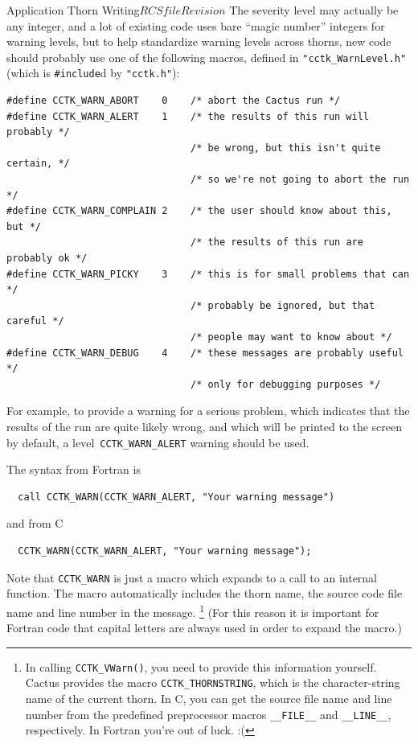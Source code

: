 \begin{cactuspart}{Application Thorn Writing}{$RCSfile$}{$Revision$}
The severity level may actually be any integer, and a lot of existing
code uses bare ``magic number'' integers for warning levels, but to
help standardize warning levels across thorns, new code should probably
use one of the following macros, defined in \verb|"cctk_WarnLevel.h"|
(which is \verb|#include|d by \verb|"cctk.h"|):
\begin{verbatim}
#define CCTK_WARN_ABORT    0    /* abort the Cactus run */
#define CCTK_WARN_ALERT    1    /* the results of this run will probably */
                                /* be wrong, but this isn't quite certain, */
                                /* so we're not going to abort the run */
#define CCTK_WARN_COMPLAIN 2    /* the user should know about this, but */
                                /* the results of this run are probably ok */
#define CCTK_WARN_PICKY    3    /* this is for small problems that can */
                                /* probably be ignored, but that careful */
                                /* people may want to know about */
#define CCTK_WARN_DEBUG    4    /* these messages are probably useful */
                                /* only for debugging purposes */
\end{verbatim}

For example, to provide a warning for a serious problem, which
indicates that the results of the run are quite likely wrong,
and which will be printed to the screen by default,
a level~\verb|CCTK_WARN_ALERT| warning should be used.

The syntax from Fortran is
\begin{verbatim}
  call CCTK_WARN(CCTK_WARN_ALERT, "Your warning message")
\end{verbatim}

and from C
\begin{verbatim}
  CCTK_WARN(CCTK_WARN_ALERT, "Your warning message");
\end{verbatim}

Note that \texttt{CCTK\_WARN} is just a macro which expands to a call
to an internal function.  The macro automatically includes the thorn name, the source code file name and line number in the message.%
\footnote{%
         In calling \texttt{CCTK\_VWarn()}, you need to
         provide this information yourself.  Cactus
         provides the macro \texttt{CCTK\_THORNSTRING},
         which is the character-string name of the
         current thorn.  In C, you can get the source
         file name and line number from the predefined
         preprocessor macros \texttt{\_\_FILE\_\_} and
         \texttt{\_\_LINE\_\_}, respectively.  In Fortran
         you're out of luck. :(
         }%
{}  (For this reason it is important for Fortran code that capital
letters are always used in order to expand the macro.)


\end{cactuspart}
